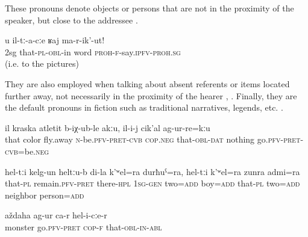 These pronouns denote objects or persons that are not in the proximity of the speaker, but close to the addressee .
%
\begin{exe}
		\label{Do not talk to them! (i.e. to the pictures)}
	\sn
	\gll	u	il-tː-a-cːe	ʁaj	ma-r-ik'-ut!\\
		2sg	that-\textsc{pl}-\textsc{obl}-in	word	\textsc{proh}-\textsc{f}-say.\textsc{ipfv}-\textsc{proh.sg}\\
	\glt	{} (i.e. to the pictures)
\end{exe}

They are also employed when talking about absent referents or items located further away, not necessarily in the proximity of the hearer , . Finally, they are the default pronouns in fiction such as traditional narratives, legends, etc. .
%
\begin{exe}
		\label{The color does not fly off, nothing happened to it.}
	\sn
	\gll	il	kraska	atletit	b-iχ-ub-le akːu, 	il-i-j	cik'al	ag-ur-re=kːu\\
		that	color	fly.away	\textsc{n}-be.\textsc{pfv}-\textsc{pret}-\textsc{cvb} \textsc{cop.neg}	that-\textsc{obl}-\textsc{dat} nothing	go.\textsc{pfv}-\textsc{pret}-\textsc{cvb}=be.\textsc{neg}\\
	\glt	{}

		\label{They remained there, my two sons and those two neighbors.}
	\sn
	\gll	hel-tːi	kelg-un	heltːu-b	di-la	k'ʷel=ra	durħuˁ=ra,	hel-tːi	k'ʷel=ra	zunra	admi=ra\\
		that-\textsc{pl}	remain.\textsc{pfv}-\textsc{pret}	there-\textsc{hpl}	\textsc{1sg-gen}	two=\textsc{add}	boy=\textsc{add}	that-\textsc{pl}	two=\textsc{add}	neighbor	person=\textsc{add}\\
	\glt	{}

	\ex	\label{She turned into a monster.}
	\gll	aždaha	ag-ur ca-r	hel-i-cːe-r \\
		monster	go.\textsc{pfv}-\textsc{pret} \textsc{cop-f}	that-\textsc{obl-in}-\textsc{abl}\\
	\glt	{}
\end{exe}


